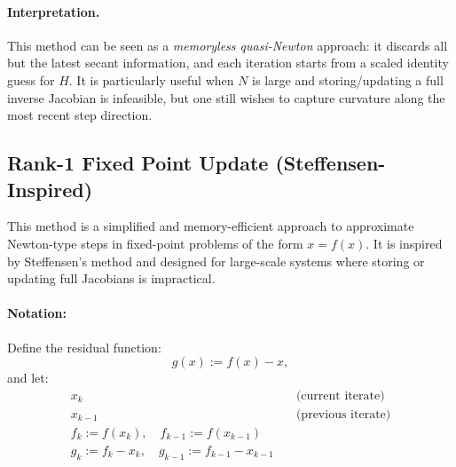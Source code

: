 \documentclass[a4paper,12pt]{article}
\begin{document}

\paragraph{Interpretation.}
This method can be seen as a \emph{memoryless quasi-Newton} approach: it discards all but the latest secant information, and each iteration starts from a scaled identity guess for $H$. It is particularly useful when $N$ is large and storing/updating a full inverse Jacobian is infeasible, but one still wishes to capture curvature along the most recent step direction.


\subsection{Rank-1 Fixed Point Update (Steffensen-Inspired)}
\label{subsec:rank1-fixed-point}

This method is a simplified and memory-efficient approach to approximate Newton-type steps in fixed-point problems of the form \( x = f(x) \). It is inspired by Steffensen’s method and designed for large-scale systems where storing or updating full Jacobians is impractical.

\vspace{0.5em}
\paragraph{Notation:} Define the residual function:
\[
g(x) := f(x) - x,
\]
and let:
\begin{align*}
x_k &\quad \text{(current iterate)} \\
x_{k-1} &\quad \text{(previous iterate)} \\
f_k := f(x_k), \quad f_{k-1} := f(x_{k-1}) \\
g_k := f_k - x_k, \quad g_{k-1} := f_{k-1} - x_{k-1}
\end{align*}
\end{document}
